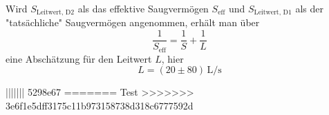 Wird $S_{\text{Leitwert, D2}}$ als das effektive Saugvermögen $S_\text{eff}$ und $S_{\text{Leitwert, D1}}$ als der "tatsächliche" Saugvermögen angenommen, erhält man über 
\begin{equation}
    \frac{1}{S_\text{eff}} = \frac{1}{S} + \frac{1}{L}
\end{equation}
eine Abschätzung für den Leitwert $L$, hier
\begin{equation}
    L = (20 \pm 80) \, \si{\liter\per\second}
\end{equation}

||||||| 5298e67
=======
Test \cite{grundlagen_vakuumtechnik}
>>>>>>> 3e6f1e5dff3175c11b973158738d318c6777592d
